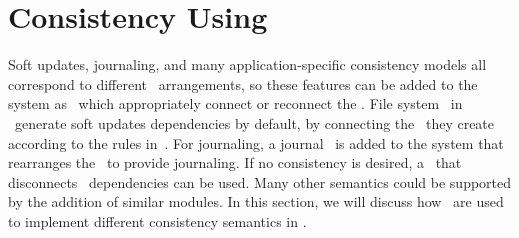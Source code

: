 \section{Consistency Using \ChDescs}
\label{sec:using}

Soft updates, journaling, and many application-specific consistency models all
correspond to different \chdesc\ arrangements, so these features can be added to
the system as \modules\ which appropriately connect or reconnect the \chdescs.
%
File system \modules\ in \Kudos\ generate soft updates dependencies by default,
by connecting the \chdescs\ they create according to the rules
in~\cite{ganger00soft}.
%
For journaling, a journal \module\ is added to the system that rearranges the
\chdescs\ to provide journaling.
%
If no consistency is desired, a \module\ that disconnects \chdesc\ dependencies
can be used.
%
Many other semantics could be supported by the addition of similar modules. In
this section, we will discuss how \chdescs\ are used to implement different
consistency semantics in \Kudos.




